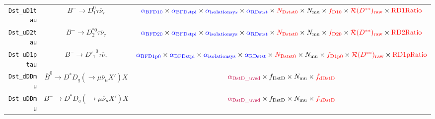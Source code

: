 \begin{landscape}
\begin{table}
\begin{tabular}{r|c|c}
  \texttt{Dst\_uD1tau} &                 $B^- \rightarrow D_1^0 \tau \overline{\nu}_\tau$                  &  $\textcolor{blue}{\alpha_\text{BFD10}} \times \textcolor{blue}{\alpha_\text{BFDstpi}} \times \textcolor{blue}{\alpha_\text{isolationsys}} \times \textcolor{blue}{\alpha_\text{RDstst}} \times \textcolor{red}{N_\text{Dstst0}} \times N_\text{mu} \times \textcolor{red}{f_\text{D10}} \times \textcolor{red}{\mathcal{R}(D^{**})_\text{raw}} \times \textcolor{red}{\text{RD1Ratio}}$   \\
  \texttt{Dst\_uD2tau} &                $B^- \rightarrow D_2^{*0} \tau \overline{\nu}_\tau$                &  $\textcolor{blue}{\alpha_\text{BFD20}} \times \textcolor{blue}{\alpha_\text{BFDstpi}} \times \textcolor{blue}{\alpha_\text{isolationsys}} \times \textcolor{blue}{\alpha_\text{RDstst}} \times \textcolor{red}{N_\text{Dstst0}} \times N_\text{mu} \times \textcolor{red}{f_\text{D20}} \times \textcolor{red}{\mathcal{R}(D^{**})_\text{raw}} \times \textcolor{red}{\text{RD2Ratio}}$   \\
 \texttt{Dst\_uD1ptau} &                $B^- \rightarrow {D'_1}^0 \tau \overline{\nu}_\tau$                & $\textcolor{blue}{\alpha_\text{BFD1p0}} \times \textcolor{blue}{\alpha_\text{BFDstpi}} \times \textcolor{blue}{\alpha_\text{isolationsys}} \times \textcolor{blue}{\alpha_\text{RDstst}} \times \textcolor{red}{N_\text{Dstst0}} \times N_\text{mu} \times \textcolor{red}{f_\text{D1p0}} \times \textcolor{red}{\mathcal{R}(D^{**})_\text{raw}} \times \textcolor{red}{\text{RD1pRatio}}$ \\
   \texttt{Dst\_dDDmu} &  $\overline{B}^0 \rightarrow D^* D_q (\rightarrow \mu \overline{\nu}_\mu X') X$   &                                                                                                                               $\textcolor{purple}{\alpha_\text{DstD\_uvsd}} \times f_\text{DstD} \times N_\text{mu} \times \textcolor{red}{f_\text{dDstD}}$                                                                                                                                \\
   \texttt{Dst\_uDDmu} &        $B^- \rightarrow D^* D_q (\rightarrow \mu \overline{\nu}_\mu X') X$        &                                                                                                                               $\textcolor{purple}{\alpha_\text{DstD\_uvsd}} \times f_\text{DstD} \times N_\text{mu} \times \textcolor{red}{f_\text{uDstD}}$                                                                                                                                \\

\end{tabular}
\end{table}
\end{landscape}
